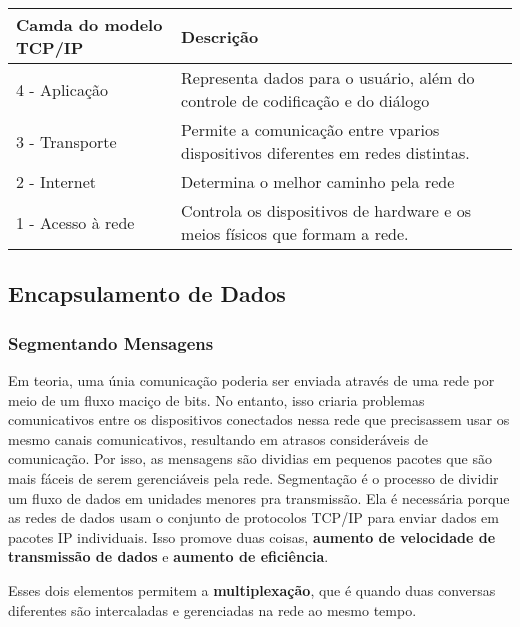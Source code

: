 \documentclass[12pt a4paper]{paper}
\begin{document}
\begin{center}
\begin{tabular}{| m{3cm} | m{7cm} |}

  \hline
  \textbf{Camda do modelo TCP/IP} & \textbf{Descrição} \\
  \hline  
  4 - Aplicação & Representa dados para o usuário, além do controle de codificação e do diálogo \\
  \hline
  3 - Transporte & Permite a comunicação entre vparios dispositivos diferentes em redes distintas.\\
  \hline
  2 - Internet & Determina o melhor caminho pela rede\\
  \hline
  1 - Acesso à rede & Controla os dispositivos de hardware e os meios físicos que formam a rede.\\

  \hline
\end{tabular}
\end{center}

\subsection{Encapsulamento de Dados} %
\label{sub:Encapsulamento de Dados}
\subsubsection{Segmentando Mensagens} %
\label{sec:Segmentando Mensagens}
Em teoria, uma únia comunicação poderia ser enviada através de uma rede por meio de um 
fluxo maciço de bits. No entanto, isso criaria problemas comunicativos entre os 
dispositivos conectados nessa rede que precisassem usar os mesmo canais comunicativos, 
resultando em atrasos consideráveis de comunicação. Por isso, as mensagens são 
dividias em pequenos pacotes que são mais fáceis de serem gerenciáveis pela rede. 
Segmentação é o processo de dividir um fluxo de dados em unidades menores pra 
transmissão. Ela é necessária porque as redes de dados usam o conjunto de protocolos 
TCP/IP para enviar dados em pacotes IP individuais. Isso promove duas coisas, 
\textbf{aumento de velocidade de transmissão de dados} e \textbf{aumento de eficiência}.

Esses dois elementos permitem a \textbf{multiplexação}, que é quando duas conversas 
diferentes são intercaladas e gerenciadas na rede ao mesmo tempo.
\end{document}
